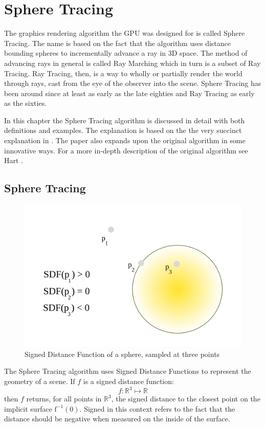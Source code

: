 \chapter{Sphere Tracing} \label{spheretracing}

	The graphics rendering algorithm the GPU was designed for is called Sphere
	Tracing\cite{Hart1996}. The name is based on the fact that the algorithm
	uses distance bounding spheres to incrementally advance a ray in 3D space.
	The method of advancing rays in general is called Ray Marching which in
	turn is a subset of Ray Tracing\cite{Whitted1980a}. Ray Tracing, then, is a
	way to wholly or partially render the world through rays, cast from the eye
	of the observer into the scene\cite{PeterShirleyMichaelAshikhmin2005}. 
	Sphere Tracing has been	around since at least as early as the late 
	eighties\cite{Hart1989} and Ray Tracing as early as the 
	sixties\cite{Appel1968}.

	In this chapter the Sphere Tracing algorithm is discussed in detail with
	both definitions and examples. The explanation is based on the the very
	succinct explanation in \cite{Korndorfer2014}. The paper also expands upon
	the original algorithm in some innovative ways. For a more in-depth
	description of the original algorithm see Hart \cite{Hart1996}.

	\section{Sphere Tracing} 

		\begin{figure}
			\includegraphics[width=0.75\linewidth]{figure/SDF} 
			\caption{Signed Distance Function of a sphere, sampled at three 
				points}
		\end{figure}

		The Sphere Tracing algorithm uses Signed Distance Functions to
		represent the geometry of a scene. If $f$ is a signed distance
		function: $$f : \mathbb{R}^{3}\mapsto\mathbb{R}$$ then $f$ returns, for
		all points in $\mathbb{R}^3$, the signed distance to the closest point
		on the implicit surface $\text{f}^{-1}(0)$. Signed in this context
		refers to the fact that the distance should be negative when measured
		on the inside of the surface.

